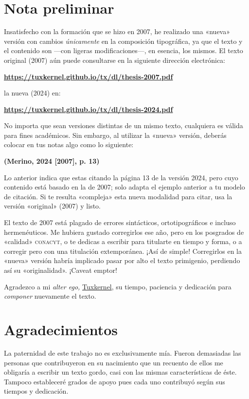 \documentclass[14pt,twoside,final]{extbook} %
\begin{document}
\chapter*{Nota preliminar}
\label{ch:nota-preliminar}
Insatisfecho con la formación que se hizo en 2007, he realizado una «nueva» versión con cambios \emph{únicamente} en la composición tipográfica, ya que el texto y el contenido son ---con ligeras modificaciones---, en esencia, los mismos. El texto original (2007) aún puede consultarse en la siguiente dirección electrónica:
\begin{center}
\href{https://tuxkernel.github.io/tx/dl/thesis-2007.pdf}{\bfseries https://tuxkernel.github.io/tx/dl/thesis-2007.pdf}
\end{center}
la nueva (2024) en:
\begin{center}
\href{https://tuxkernel.github.io/tx/dl/thesis-2024.pdf}{\bfseries https://tuxkernel.github.io/tx/dl/thesis-2024.pdf}
\end{center}
No importa que sean versiones distintas de un mismo texto, cualquiera es válida para fines académicos. Sin embargo, al utilizar la «nueva» versión, deberás colocar en tus notas algo como lo siguiente:
\begin{center}
\bfseries (Merino, 2024 [2007], p. 13)
\end{center}
\noindent Lo anterior indica que estas citando la página 13 de la versión 2024, pero cuyo contenido está basado en la de 2007; solo adapta el ejemplo anterior a tu modelo de citación. Si te resulta «compleja» esta nueva modalidad para citar, usa la versión «original» (2007) y listo.

El texto de 2007 está plagado de errores sintácticos, ortotipográficos e incluso hermenéuticos. Me hubiera gustado corregirlos ese año, pero en los posgrados de «calidad» \textsc{conacyt}, o te dedicas a escribir para titularte en tiempo y forma, o a corregir pero con una titulación extemporánea. ¡Así de simple! Corregirlos en la «nueva» versión habría implicado pasar por alto el texto primigenio, perdiendo así su «originalidad». ¡Caveat emptor!

Agradezco a mi \emph{alter ego,} \href{muxkernel@gmail.com}{Tuxkernel}, su tiempo, paciencia y dedicación para \emph{componer} nuevamente el texto.
\chapter*{Agradecimientos}
\label{ch:agradecimientos}
\thispagestyle{empty}
\pagestyle{fancy}
\fancyhf{} %
\fancyhead[LE,RO]{\thepage} %
\renewcommand{\headrulewidth}{0pt}
La paternidad de este trabajo no es exclusivamente mía. Fueron demasiadas las personas que contribuyeron en su nacimiento que un recuento de ellos me obligaría a escribir un texto gordo, casi con las mismas características de éste. Tampoco estableceré grados de apoyo pues cada uno contribuyó según sus tiempos y dedicación.
\end{document}
